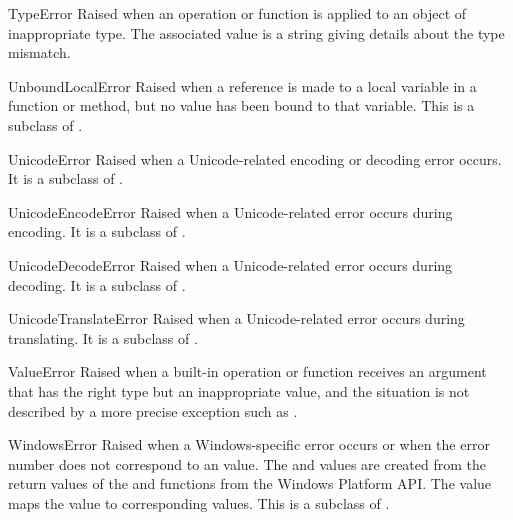 \begin{excdesc}{TypeError}
  Raised when an operation or function is applied to an object
  of inappropriate type.  The associated value is a string giving
  details about the type mismatch.
\end{excdesc}

\begin{excdesc}{UnboundLocalError}
  Raised when a reference is made to a local variable in a function or
  method, but no value has been bound to that variable.  This is a
  subclass of .
\end{excdesc}

\begin{excdesc}{UnicodeError}
  Raised when a Unicode-related encoding or decoding error occurs.  It
  is a subclass of .
\end{excdesc}

\begin{excdesc}{UnicodeEncodeError}
  Raised when a Unicode-related error occurs during encoding.  It
  is a subclass of .
\end{excdesc}

\begin{excdesc}{UnicodeDecodeError}
  Raised when a Unicode-related error occurs during decoding.  It
  is a subclass of .
\end{excdesc}

\begin{excdesc}{UnicodeTranslateError}
  Raised when a Unicode-related error occurs during translating.  It
  is a subclass of .
\end{excdesc}

\begin{excdesc}{ValueError}
  Raised when a built-in operation or function receives an argument
  that has the right type but an inappropriate value, and the
  situation is not described by a more precise exception such as
  .
\end{excdesc}

\begin{excdesc}{WindowsError}
  Raised when a Windows-specific error occurs or when the error number
  does not correspond to an  value.  The
   and  values are created from the
  return values of the  and
   functions from the Windows Platform API.
  The  value maps the  value to 
  corresponding  values.
  This is a subclass of .
\end{excdesc}

